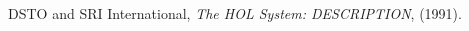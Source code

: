 \begin{thebibliography}{99}

{\small DSTO} and {\small SRI} International, 
{\it The HOL System: DESCRIPTION}, (1991).

\end{thebibliography}


